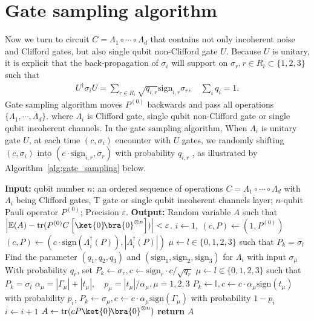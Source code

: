 \documentclass[aps,%
twocolumn,%
floatfix,%
pra,%
amsfonts,%
longbibliography,%
groupedaddress,%
superscriptaddress]{revtex4-2}%
\newcommand{\1}{\mathbbm{1}}
\begin{document}
\section{Gate sampling algorithm}
Now we turn to circuit $C = \Lambda_1 \circ \cdots \circ \Lambda_{d}$ that contains not only incoherent noise and Clifford gates, but also single qubit non-Clifford gate $U$.
Because $U$ is unitary, it is explicit that the back-propagation of $\sigma_i$ will support on $\sigma_r, r \in R_i \subset\{1,2,3\}$ such that
 \begin{align}
     U^\dagger \sigma_i U= \sum_{r\in R_i} \sqrt{q_{i,r}} \text{sign}_{i,r} \sigma_r,\quad  \sum_i q_i = 1.
 \end{align}
Gate sampling algorithm moves $P^{(0)}$ backwards and pass all operations $\{\Lambda_1, \cdots,\Lambda_d\}$. where $\Lambda_i$ is Clifford gate, single qubit non-Clifford gate or single qubit incoherent channels. 
In the gate sampling algorithm, When $\Lambda_i$ is unitary gate $U$, 
at each time  $(c,\sigma_i)$  encounter with $U$ gates, we randomly shifting $(c,\sigma_i)$ into $(c \cdot \text{sign}_{i,r},\sigma_r)$ with probability $q_{i,r}$ , as illustrated by Algorithm~\ref{alg:gate_sampling} below.
\begin{widetext}

\begin{algorithm}[htbp!]
\caption{Gate Sampling algorithm}
\label{alg:gate_sampling}
\begin{algorithmic}[1]
\State \textbf{Input:} qubit number $n$; an ordered sequence of operations $C = \Lambda_1 \circ \cdots \circ \Lambda_{d}$ with $\Lambda_i$ being Clifford gates, T gate or single qubit incoherent channels layer; $n$-qubit Pauli operator $P^{(0)}$; Precision $\varepsilon$.
\State \textbf{Output:} Random variable $A$ such that $\left|\mathbb{E}(A) - \text{tr}( P^{(0)} C\left[\ket{0}\!\bra{0}^{\otimes n}\right] )\right| < \varepsilon$.
\State $i \gets 1,~ (c,P) \gets (1,P^{(0)})$
        \State $(c,P) \gets (c\cdot\text{sign}(\Lambda_i^\dagger(P)),|\Lambda_i^\dagger(P)|)$
        \State  $\mu \gets l \in \{0,1,2,3\}$ such that $P_k = \sigma_l$
        \State Find the parameter $(q_1, q_2,q_3)$ and $(\text{sign}_1,\text{sign}_2,\text{sign}_3)$ for $\Lambda_i$ with input $\sigma_\mu$
        \State With probability $q_r$, set $P_k\gets  \sigma_r,c\gets \text{sign}_r \cdot c/\sqrt{q_r}$ 
             \State  $\mu \gets l \in \{0,1,2,3\}$ such that $P_k = \sigma_l$
                \State $\alpha_\mu = |\Gamma_\mu| + |t_\mu|, \quad  p_\mu = |t_\mu|/\alpha_\mu,\mu = 1,2,3$
                \State $P_k \gets \mathbb{I}, c \gets c \cdot \alpha_\mu \text{sign}(t_\mu) $ with probability $p_i$, $P_k \gets  \sigma_\mu, c \gets c \cdot \alpha_\mu \text{sign}(\Gamma_\mu)$ with probability $1-p_i$
    \EndIf
    \State $i \gets i + 1$
\EndWhile
\State $A \gets \text{tr}(cP \ket{0}\!\bra{0}^{\otimes n})$
\State \textbf{return} $A$
\end{algorithmic}
\end{algorithm}
\end{widetext}
\end{document}
